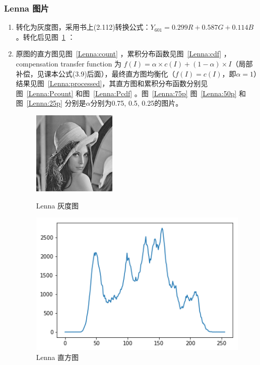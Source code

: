 \documentclass[a4paper,UTF8]{article}
\numberwithin{equation}{section}
\begin{document}
\subsubsection{Lenna 图片}
\begin{enumerate}[(\romannumeral1)]
	\item 转化为灰度图，采用书上(2.112)转换公式：$Y_{601}=0.299R+0.587G+0.114B$。转化后见图~\ref{Lenna:gray} ：
	\item 原图的直方图见图~\ref{Lenna:count} ，累积分布函数见图~\ref{Lenna:cdf}  ，compensation transfer function 为 $f(I)=\alpha×c(I)+(1-\alpha)×I$（局部补偿，见课本公式(3.9)后面），最终直方图均衡化（$f(I)=c(I)，即\alpha=1$）结果见图~\ref{Lenna:processed}，其直方图和累积分布函数分别见图~\ref{Lenna:Pcount} 和图~\ref{Lenna:Pcdf} 。图~\ref{Lenna:75p} 图~\ref{Lenna:50p} 和图~\ref{Lenna:25p} 分别是$\alpha$分别为0.75, 0.5, 0.25的图片。
\begin{figure}[htbp]
\centering
\begin{minipage}[t]{0.30\textwidth}
\centering
\includegraphics[width=4cm]{Lenna_gray.png}
\caption{Lenna 灰度图}
\label{Lenna:gray}
\end{minipage}
\centering
\begin{minipage}[t]{0.3\textwidth}
\centering
\includegraphics[width=1.0\textwidth]{global_pdf.png}
\caption{Lenna 直方图}

\end{minipage}
\end{figure}
\end{enumerate}
\end{document}
